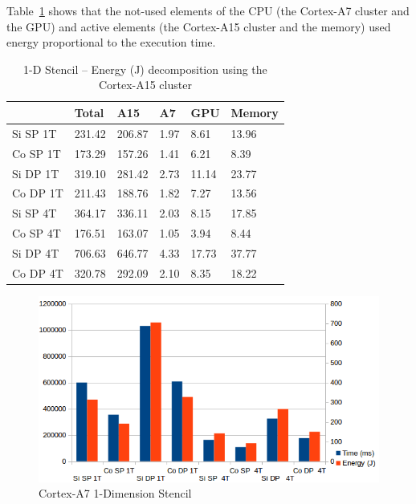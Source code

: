 \documentclass{acm_proc_article-sp}
\begin{document}
Table~\ref{tbl:energy-A15-1D} shows that the not-used elements of the CPU (the Cortex-A7 cluster and the GPU) and active elements (the Cortex-A15 cluster and the memory) used energy proportional to the execution time.
\begin{table}[ht]
  \begin{center}
    \begin{tabular}{| l | l | l | l | l | l |}
      \hline
      & Total & A15 & A7 & GPU & Memory \\ \hline
      Si SP 1T & 231.42 & 206.87 & 1.97 &  8.61  & 13.96 \\ \hline
      Co SP 1T & 173.29 & 157.26 & 1.41 &  6.21  & 8.39  \\ \hline
      Si DP 1T & 319.10 & 281.42 & 2.73 &  11.14 & 23.77 \\ \hline
      Co DP 1T & 211.43 & 188.76 & 1.82 &  7.27  & 13.56 \\ \hline
      Si SP 4T & 364.17 & 336.11 & 2.03 &  8.15  & 17.85 \\ \hline
      Co SP 4T & 176.51 & 163.07 & 1.05 &  3.94	 & 8.44  \\ \hline
      Si DP 4T & 706.63 & 646.77 & 4.33 &  17.73 & 37.77 \\ \hline
      Co DP 4T & 320.78 & 292.09 & 2.10 &  8.35	 & 18.22 \\ \hline
    \end{tabular}
    \caption{1-D Stencil -- Energy (J) decomposition using the Cortex-A15 cluster}
    \label{tbl:energy-A15-1D}
  \end{center}
\end{table}

\begin{figure}[ht!]
  \centering
  \includegraphics[scale=0.5]{results/A7-1D}
  \caption{Cortex-A7 1-Dimension Stencil}
  \label{pic:A7-1d}
\end{figure}
\end{document}
